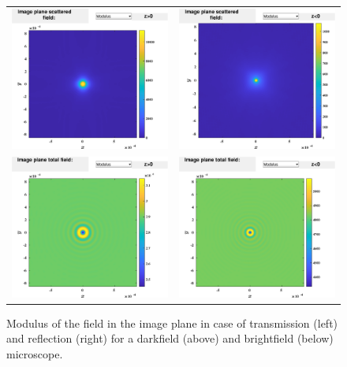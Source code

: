 \begin{figure}[H]
\begin{center}
\begin{tabular}{cc}
  \includegraphics*[width=7.0cm,draft=false]{test3imageposwf.eps}
&  \includegraphics*[width=7.0cm,draft=false]{test3imagenegwf.eps} \\
\includegraphics*[width=7.0cm,draft=false]{test3imageincposwf.eps}
&  \includegraphics*[width=7.0cm,draft=false]{test3imageincnegwf.eps}
\end{tabular}
\end{center}
\caption{Modulus of the field in the image plane in case of
  transmission (left) and reflection (right) for a darkfield (above)
  and brightfield (below) microscope.}
\end{figure}
